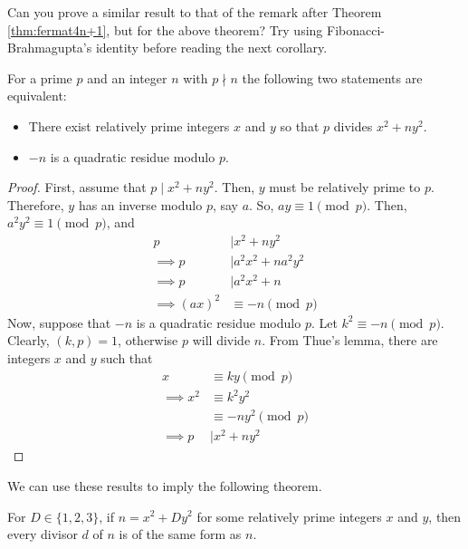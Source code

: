 \begin{question}
	Can you prove a similar result to that of the remark after Theorem \autoref{thm:fermat4n+1}, but for the above theorem? Try using Fibonacci-Brahmagupta's identity before reading the next corollary.
\end{question}

\begin{corollary}\label{cor:p|x^2+ny^2}
	For a prime $p$ and an integer $n$ with $p \nmid n$ the following two statements are equivalent:
	\begin{itemize}
		\item There exist relatively prime integers $x$ and $y$ so that $p$ divides $x^2+ny^2$.
		\item $-n$ is a quadratic residue modulo $p$.
	\end{itemize}
\end{corollary}

\begin{proof}
	First, assume that $p\mid x^2+ny^2$. Then, $y$ must be relatively prime to $p$. Therefore, $y$ has an inverse modulo $p$, say $a$. So, $ay\equiv1\pmod p$. Then, $a^2y^2  \equiv1\pmod p$, and
	\begin{align*}
		p
			& \mid x^2 + ny^2\\
		\implies p
			& \mid a^2x^2+na^2y^2\\
		\implies p
			& \mid a^2x^2+n\\
		\implies (ax)^2
			& \equiv-n\pmod p
	\end{align*}
	Now, suppose that $-n$ is a quadratic residue modulo $p$. Let $k^2\equiv-n\pmod p$. Clearly, $(k,p)=1$, otherwise $p$ will divide $n$. From Thue's lemma, there are integers $x$ and $y$ such that
	\begin{align*}
		x
			& \equiv ky\pmod p\\
		\implies x^2
			& \equiv k^2y^2\\
			& \equiv-ny^2\pmod p\\
		\implies  p
			& \mid x^2+ny^2
	\end{align*}
\end{proof}
We can use these results to imply the following theorem.
\begin{theorem}
	For $D\in\{1,2,3\}$, if $n=x^2+Dy^2$ for some relatively prime integers $x$ and $y$, then every divisor $d$ of $n$ is of the same form as $n$.
\end{theorem}

